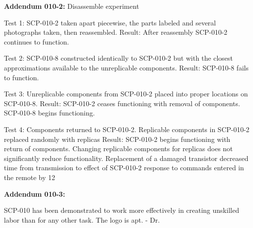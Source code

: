 \textbf{Addendum 010-2:} Disassemble experiment

Test 1: SCP-010-2 taken apart piecewise, the parts labeled and several photographs taken, then reassembled.
Result: After reassembly SCP-010-2 continues to function.

Test 2: SCP-010-8 constructed identically to SCP-010-2 but with the closest approximations available to the unreplicable components.
Result: SCP-010-8 fails to function.

Test 3: Unreplicable components from SCP-010-2 placed into proper locations on SCP-010-8.
Result: SCP-010-2 ceases functioning with removal of components. SCP-010-8 begins functioning.

Test 4: Components returned to SCP-010-2. Replicable components in SCP-010-2 replaced randomly with replicas
Result: SCP-010-2 begins functioning with return of components. Changing replicable components for replicas does not significantly reduce functionality. Replacement of a damaged transistor decreased time from transmission to effect of SCP-010-2 response to commands entered in the remote by 12%

\textbf{Addendum 010-3:}

SCP-010 has been demonstrated to work more effectively in creating unskilled labor than for any other task. The logo is apt. - Dr. 